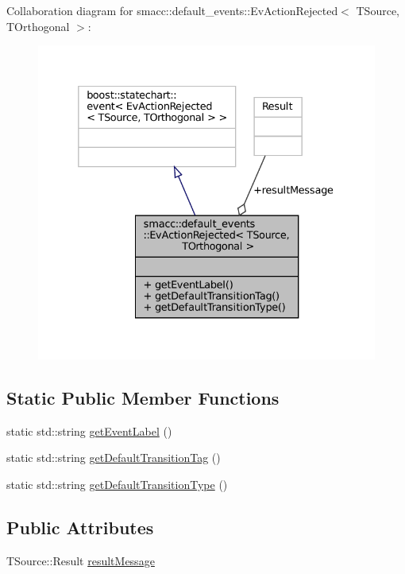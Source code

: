 Collaboration diagram for smacc\+:\+:default\+\_\+events\+:\+:Ev\+Action\+Rejected$<$ T\+Source, T\+Orthogonal $>$\+:
\nopagebreak
\begin{figure}[H]
\begin{center}
\leavevmode
\includegraphics[width=332pt]{structsmacc_1_1default__events_1_1EvActionRejected__coll__graph}
\end{center}
\end{figure}
\subsection*{Static Public Member Functions}
\begin{DoxyCompactItemize}
\item 
static std\+::string \hyperlink{structsmacc_1_1default__events_1_1EvActionRejected_a4f29fd240fbc8c6c5d6820fe5dd917ce}{get\+Event\+Label} ()
\item 
static std\+::string \hyperlink{structsmacc_1_1default__events_1_1EvActionRejected_ad7fcf7986d66cee47b34db537fc17310}{get\+Default\+Transition\+Tag} ()
\item 
static std\+::string \hyperlink{structsmacc_1_1default__events_1_1EvActionRejected_ad96234edf53fc5bfeddec95630513061}{get\+Default\+Transition\+Type} ()
\end{DoxyCompactItemize}
\subsection*{Public Attributes}
\begin{DoxyCompactItemize}
\item 
T\+Source\+::\+Result \hyperlink{structsmacc_1_1default__events_1_1EvActionRejected_a237f31400f782599840099b1668fea66}{result\+Message}
\end{DoxyCompactItemize}


